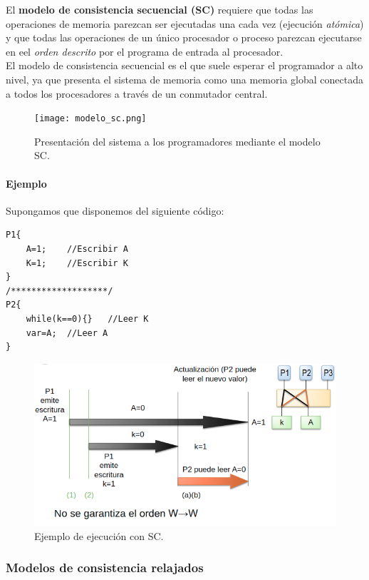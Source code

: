 \documentclass[12pt,spanish]{article}
\begin{document}
El \textbf{modelo de consistencia secuencial (SC)} requiere que todas las operaciones de memoria parezcan ser ejecutadas una cada vez (ejecución \emph{atómica}) y que todas las operaciones de un único procesador o proceso parezcan ejecutarse en eel \emph{orden descrito} por el programa de entrada al procesador.\\

El modelo de consistencia secuencial es el que suele esperar el programador a alto nivel, ya que presenta el sistema de memoria como una memoria global conectada a todos los procesadores a través de un conmutador central.

\begin{figure}[H]
\centering
\texttt{[image: modelo\_sc.png]}
\caption{Presentación del sistema a los programadores mediante el modelo SC.}
\end{figure}

\paragraph{Ejemplo} Supongamos que disponemos del siguiente código:
\begin{verbatim}
P1{
	A=1;	//Escribir A
	K=1;	//Escribir K
}
/*******************/
P2{
	while(k==0){}	//Leer K
	var=A;	//Leer A
}
\end{verbatim}


\begin{figure}[H]
\centering
\includegraphics[scale=0.75]{ej_sc.png}
\caption{Ejemplo de ejecución con SC.}
\end{figure}

\subsubsection{Modelos de consistencia relajados}
\end{document}
